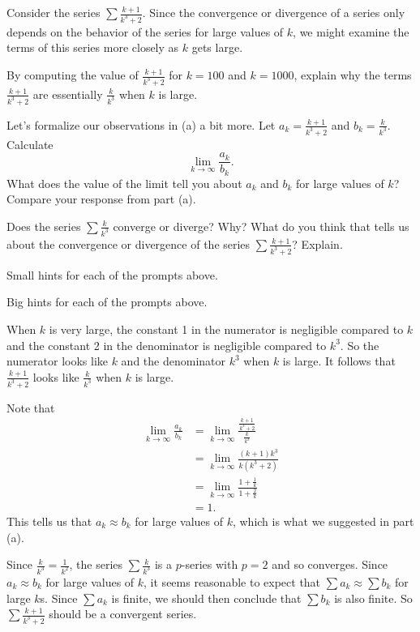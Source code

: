 \begin{activity} \label{8.3.Act6} Consider the series $ \sum \frac{k+1}{k^3+2}$. Since the convergence or divergence of a series only depends on the behavior of the series for large values of $k$, we might examine the terms of this series more closely as $k$ gets large.
    \ba
    \item By computing the value of $ \frac{k+1}{k^3+2}$ for $k = 100$ and $k = 1000$, explain why the terms $ \frac{k+1}{k^3+2}$ are essentially $ \frac{k}{k^3}$ when $k$ is large. 

    \item Let's formalize our observations in (a) a bit more. Let $a_k =  \frac{k+1}{k^3+2}$ and $b_k =  \frac{k}{k^3}$. Calculate 
    \[\lim_{k \to \infty} \frac{a_k}{b_k}.\]
    What does the value of the limit tell you about $a_k$ and $b_k$ for large values of $k$? Compare your response from part (a). 

    \item Does the series $ \sum \frac{k}{k^3}$ converge or diverge? Why? What do you think that tells us about the convergence or divergence of the series $ \sum \frac{k+1}{k^3+2}$? Explain. 

\ea
\end{activity}

\begin{smallhint}
\ba
	\item Small hints for each of the prompts above.
\ea
\end{smallhint}
\begin{bighint}
\ba
	\item Big hints for each of the prompts above.
\ea
\end{bighint}
\begin{activitySolution}
\ba
	\item When $k$ is very large, the constant 1 in the numerator is negligible compared to $k$ and the constant 2 in the denominator is negligible compared to $k^3$. So the numerator looks like $k$ and the denominator $k^3$ when $k$ is large. It follows that $ \frac{k+1}{k^3+2}$ looks like $ \frac{k}{k^3}$ when $k$ is large.
    \item Note that 
    \begin{align*}
    \lim_{k \to \infty} \frac{a_k}{b_k} &= \lim_{k \to \infty} \frac{ \frac{k+1}{k^3+2} }{ \frac{k}{k^3} } \\
        &= \lim_{k \to \infty} \frac{(k+1)k^3}{k(k^3+2)} \\
        &= \lim_{k \to \infty} \frac{1+\frac{1}{k}}{1+\frac{2}{k}} \\
        &= 1.
    \end{align*}
    This tells us that $a_k \approx b_k$ for large values of $k$, which is what we suggested in part (a). 
    \item Since $\frac{k}{k^3} = \frac{1}{k^2}$, the series $ \sum \frac{k}{k^3}$ is a $p$-series with $p=2$ and so converges. Since $a_k \approx b_k$ for large values of $k$, it seems reasonable to expect that $\sum a_k \approx \sum b_k$ for large $k$s. Since $\sum a_k$ is finite, we should then conclude that $\sum b_k$ is also finite. So $ \sum \frac{k+1}{k^3+2}$ should be a convergent series. 
\ea
\end{activitySolution}
\aftera 